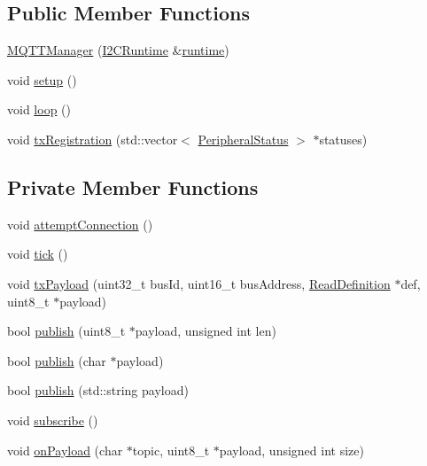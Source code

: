 \subsection*{Public Member Functions}
\begin{DoxyCompactItemize}
\item 
\mbox{\hyperlink{class_m_q_t_t_manager_af4a0454e2b8c10d989df9647c31611ad}{M\+Q\+T\+T\+Manager}} (\mbox{\hyperlink{class_i2_c_runtime}{I2\+C\+Runtime}} \&\mbox{\hyperlink{main_8cpp_a1fa047c23d7c85d1ad97022cd6b157d0}{runtime}})
\item 
void \mbox{\hyperlink{class_m_q_t_t_manager_a522f958b12d67c372a02c55ec0c24261}{setup}} ()
\item 
void \mbox{\hyperlink{class_m_q_t_t_manager_a9266e647933501851b411b6d2a9a1f95}{loop}} ()
\item 
void \mbox{\hyperlink{class_m_q_t_t_manager_aa7c667290f7d20e611f58de25b9b0354}{tx\+Registration}} (std\+::vector$<$ \mbox{\hyperlink{struct_peripheral_status}{Peripheral\+Status}} $>$ $\ast$statuses)
\end{DoxyCompactItemize}
\subsection*{Private Member Functions}
\begin{DoxyCompactItemize}
\item 
void \mbox{\hyperlink{class_m_q_t_t_manager_a99b5f971ca290bec4afe7d6da0003812}{attempt\+Connection}} ()
\item 
void \mbox{\hyperlink{class_m_q_t_t_manager_a19b077a9e80135537efee44963883b3c}{tick}} ()
\item 
void \mbox{\hyperlink{class_m_q_t_t_manager_a517bb71c7de061b711a025013564e232}{tx\+Payload}} (uint32\+\_\+t bus\+Id, uint16\+\_\+t bus\+Address, \mbox{\hyperlink{struct_read_definition}{Read\+Definition}} $\ast$def, uint8\+\_\+t $\ast$payload)
\item 
bool \mbox{\hyperlink{class_m_q_t_t_manager_a1559f6ac139c883032ecf9283304b3f4}{publish}} (uint8\+\_\+t $\ast$payload, unsigned int len)
\item 
bool \mbox{\hyperlink{class_m_q_t_t_manager_aba95650540cd217055d1e0b993988561}{publish}} (char $\ast$payload)
\item 
bool \mbox{\hyperlink{class_m_q_t_t_manager_aec3beb05d7f795b3334d9f9a5c9d9421}{publish}} (std\+::string payload)
\item 
void \mbox{\hyperlink{class_m_q_t_t_manager_ad714e14eda21ba3edb0957ccb6bf8ef4}{subscribe}} ()
\item 
void \mbox{\hyperlink{class_m_q_t_t_manager_a8e90a9d70e31ba4af28da5370d68902d}{on\+Payload}} (char $\ast$topic, uint8\+\_\+t $\ast$payload, unsigned int size)
\end{DoxyCompactItemize}

